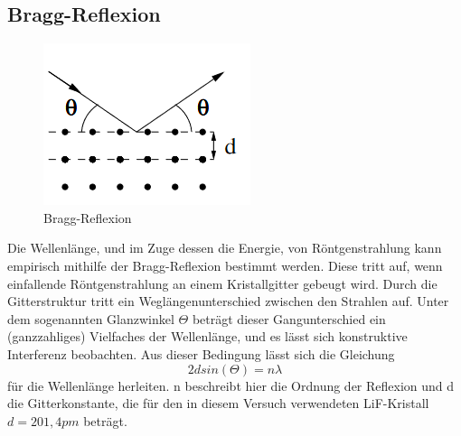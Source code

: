 \subsection{Bragg-Reflexion}
\begin{figure}[h]
    \centering
    \includegraphics{Bragg-Reflexion}
    \caption{Bragg-Reflexion}
\end{figure}
Die Wellenlänge, und im Zuge dessen die Energie, von Röntgenstrahlung kann empirisch mithilfe der Bragg-Reflexion bestimmt werden. Diese tritt auf, wenn einfallende Röntgenstrahlung an einem Kristallgitter gebeugt wird. Durch die Gitterstruktur tritt ein Weglängenunterschied zwischen den Strahlen auf. Unter dem sogenannten Glanzwinkel $\Theta$ beträgt dieser Gangunterschied ein (ganzzahliges) Vielfaches der Wellenlänge, und es lässt sich konstruktive Interferenz beobachten. Aus dieser Bedingung lässt sich die Gleichung
\begin{equation}
2dsin(\Theta)=n\lambda
\end{equation}
für die Wellenlänge herleiten. n beschreibt hier die Ordnung der Reflexion und d die Gitterkonstante, die für den in diesem Versuch verwendeten LiF-Kristall $d=201,4 pm$ beträgt.
